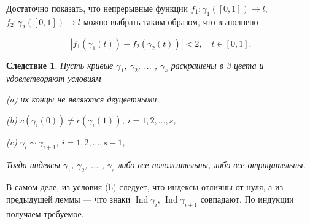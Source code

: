 \documentclass[12pt,a4paper]{article}
\newtheorem{corollary}{Следствие}[theorem]
\begin{document}
Достаточно показать, что непрерывные функции $f_1: \gamma_1([0,1]) \to l$, $f_2: \gamma_2([0,1]) \to l$ можно выбрать таким образом, что  выполнено

\[
    |f_1(\gamma_1(t)) - f_2(\gamma_2(t))| < 2, \quad t \in [0,1].
\]



\begin{corollary}
    Пусть кривые $\gamma_1$, $\gamma_2$, ... , $\gamma_{s}$ раскрашены в 3 цвета и удовлетворяют условиям

    (a) их концы не являются двуцветными, 
    
    (b) $c(\gamma_i(0)) \neq c(\gamma_i(1))$, $i=1,2, \dots, s$,

    (c) $\gamma_i \sim \gamma_{i+1}$, $i=1,2, \dots, s-1$,

Тогда индексы $\gamma_1$, $\gamma_2$, ... , $\gamma_{s}$ либо все положительны, либо все отрицательны. 
\label{ind_sequence}
\end{corollary}

В самом деле, из условия (b) следует, что индексы отличны от нуля, а из предыдущей леммы --- что знаки $\operatorname{Ind} \gamma_i$, $\operatorname{Ind} \gamma_{i+1}$ совпадают. По индукции получаем требуемое.








\end{document}
